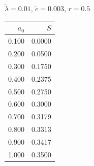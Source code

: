 \documentclass[11pt,a4paper,dvipsnames,twosided]{article}
\begin{document}
\begin{minipage}[t]{\textwidth}
\begin{minipage}[t]{0.32\textwidth}
        \footnotesize
        \begin{flushleft}$\tilde{\lambda}=0.01$, $\tilde{c}=0.003$, $r=0.5$\end{flushleft}
        \begin{tabular}[t]{rr}
            $a_0$ & $S$ \\
            \hline
             0.100 & 0.0000 \\
             0.200 & 0.0500 \\
             0.300 & 0.1750 \\
             0.400 & 0.2375 \\
             0.500 & 0.2750 \\
             0.600 & 0.3000 \\
             0.700 & 0.3179 \\
             0.800 & 0.3313 \\
             0.900 & 0.3417 \\
             1.000 & 0.3500 \\
        \end{tabular}
    \end{minipage}
\end{minipage}
\end{document}
